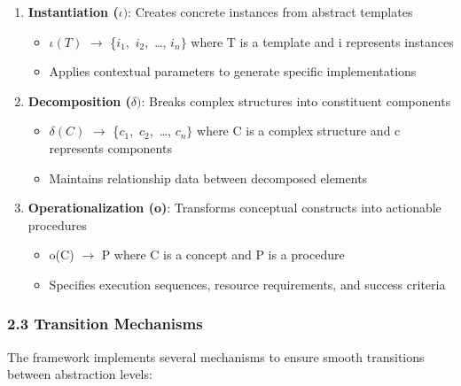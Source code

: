 \documentclass[
]{article}
\providecommand{\tightlist}{%
  \setlength{\itemsep}{0pt}\setlength{\parskip}{0pt}}
\begin{document}
\begin{enumerate}
\def\labelenumi{\arabic{enumi}.}
\tightlist
\item
  \textbf{Instantiation (\(\iota )\)}: Creates concrete instances from
  abstract templates

  \begin{itemize}
  \tightlist
  \item
    \(\iota (T)\) \(\to \) \{\(i_{1},\) \(i_{2},\) \ldots, \(i_{n}\}\)
    where T is a template and i represents instances
  \item
    Applies contextual parameters to generate specific implementations
  \end{itemize}
\item
  \textbf{Decomposition (\(\delta )\)}: Breaks complex structures into
  constituent components

  \begin{itemize}
  \tightlist
  \item
    \(\delta (C)\) \(\to \) \{\(c_{1},\) \(c_{2},\) \ldots, \(c_{n}\}\)
    where C is a complex structure and c represents components
  \item
    Maintains relationship data between decomposed elements
  \end{itemize}
\item
  \textbf{Operationalization (o)}: Transforms conceptual constructs into
  actionable procedures

  \begin{itemize}
  \tightlist
  \item
    o(C) \(\to \) P where C is a concept and P is a procedure
  \item
    Specifies execution sequences, resource requirements, and success
    criteria
  \end{itemize}
\end{enumerate}

\subsubsection{2.3 Transition Mechanisms}\label{transition-mechanisms}

The framework implements several mechanisms to ensure smooth transitions
between abstraction levels:
\end{document}
